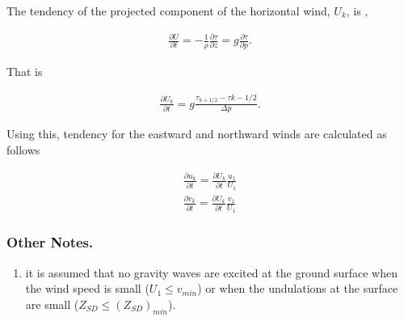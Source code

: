 The tendency of the projected component of the horizontal wind,
\(U_{k}\), is ,

\begin{eqnarray}
  \frac{\partial U}{\partial t}
        = - \frac{1}{\rho} \frac{\partial \tau}{\partial z}
        = g  \frac{\partial \tau}{\partial p}.
\end{eqnarray}

That is

\begin{eqnarray}
  \frac{\partial U_{k}}{\partial t}
        =  g  \frac{\tau_{k+1/2} - \tau{k-1/2}}{\Delta p}.
\end{eqnarray}

Using this, tendency for the eastward and northward winds are calculated
as follows

\begin{eqnarray}
  \frac{\partial u_{k}}{\partial t}  =
           \frac{\partial U_{k}}{\partial t} \frac{u_{1}}{U_{1}} \\
  \frac{\partial v_{k}}{\partial t}  =
           \frac{\partial U_{k}}{\partial t} \frac{v_{1}}{U_{1}}
\end{eqnarray}

\hypertarget{other-notes.}{%
\subsubsection{Other Notes.}\label{other-notes.}}

\begin{enumerate}
\def\labelenumi{\arabic{enumi}.}
\tightlist
\item
  it is assumed that no gravity waves are excited at the ground surface
  when the wind speed is small (\(U_{1} \le v_{min}\)) or when the
  undulations at the surface are small (\(Z_{SD} \le (Z_{SD})_{min}\)).
\end{enumerate}
